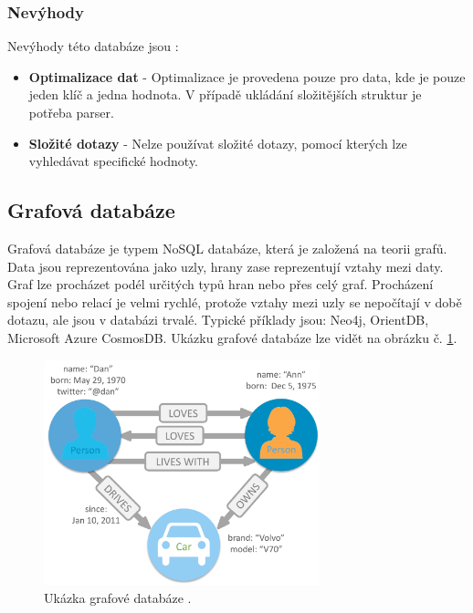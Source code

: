 \subsubsection{Nevýhody}
Nevýhody této databáze jsou \cite{advantages_keyvalue}:
\begin{itemize}
\item \textbf{Optimalizace dat} - Optimalizace je provedena pouze pro data, kde je pouze jeden klíč a jedna hodnota. V případě ukládání složitějších struktur je potřeba parser. 
\item \textbf{Složité dotazy} - Nelze používat složité dotazy, pomocí kterých lze vyhledávat specifické hodnoty.
\end{itemize}

\subsection{Grafová databáze}
Grafová databáze je typem NoSQL databáze, která je založená na teorii grafů. Data jsou reprezentována jako uzly, hrany zase reprezentují vztahy mezi daty. Graf lze procházet podél určitých typů hran nebo přes celý graf. Procházení spojení nebo relací je velmi rychlé, protože vztahy mezi uzly se nepočítají v době dotazu, ale jsou v databázi trvalé. Typické příklady jsou: Neo4j, OrientDB, Microsoft Azure CosmosDB. Ukázku grafové databáze lze vidět na obrázku č. \ref{fig:db_img_graph}.
	\begin{figure}[H]
	\centering
	\includegraphics[width=8cm]{img/databaze/graph_db}
	\caption{Ukázka grafové databáze \cite{neo_graph}.}
	\label{fig:db_img_graph}
	\end{figure}
\newpage
